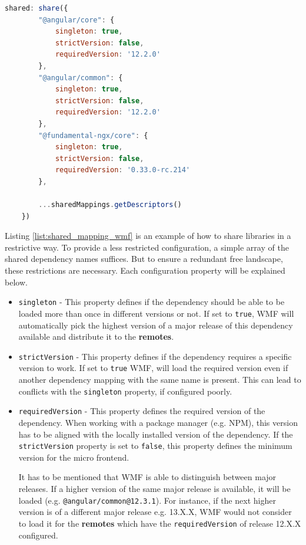 \begin{lstlisting}[language=JavaScript, caption=Example of sharing dependencies configured in the \texttt{webpack.config.js}, label=list:shared_mapping_wmf,  xleftmargin=.0\textwidth, xrightmargin=.0\textwidth]
	shared: share({
		"@angular/core": { 
			singleton: true, 
			strictVersion: false, 
			requiredVersion: '12.2.0' 
		},
		"@angular/common": { 
			singleton: true, 
			strictVersion: false, 
			requiredVersion: '12.2.0' 
		},
		"@fundamental-ngx/core": { 
			singleton: true, 
			strictVersion: false, 
			requiredVersion: '0.33.0-rc.214' 
		},
		
		...sharedMappings.getDescriptors()
	})
\end{lstlisting}

Listing \ref{list:shared_mapping_wmf} is an example of how to share libraries in a restrictive way. To provide a less restricted configuration, a simple array of the shared dependency names suffices. But to ensure a redundant free landscape, these restrictions are necessary. Each configuration property will be explained below.

\begin{itemize}
	\item \texttt{singleton} - This property defines if the dependency should be able to be loaded more than once in different versions or not. If set to \texttt{true}, WMF will automatically pick the highest version of a major release of this dependency available and distribute it to the \textbf{remotes}.\cite{wmf_version_mismatch}
	
	\item \texttt{strictVersion} - This property defines if the dependency requires a specific version to work. If set to \texttt{true} WMF, will load the required version even if another dependency mapping with the same name is present. This can lead to conflicts with the \texttt{singleton} property, if configured poorly.
	
	\item \texttt{requiredVersion} - This property defines the required version of the dependency. When working with a package manager (e.g. NPM), this version has to be aligned with the locally installed version of the dependency. If the \texttt{strictVersion} property is set to \texttt{false}, this property defines the minimum version for the micro frontend. 
	
	It has to be mentioned that WMF is able to distinguish between major releases. If a higher version of the same major release is available, it will be loaded (e.g. \texttt{@angular/common@12.3.1}). For instance, if the next higher version is of a different major release e.g. 13.X.X, WMF would not consider to load it for the \textbf{remotes} which have the \texttt{requiredVersion} of release 12.X.X configured.
\end{itemize}

